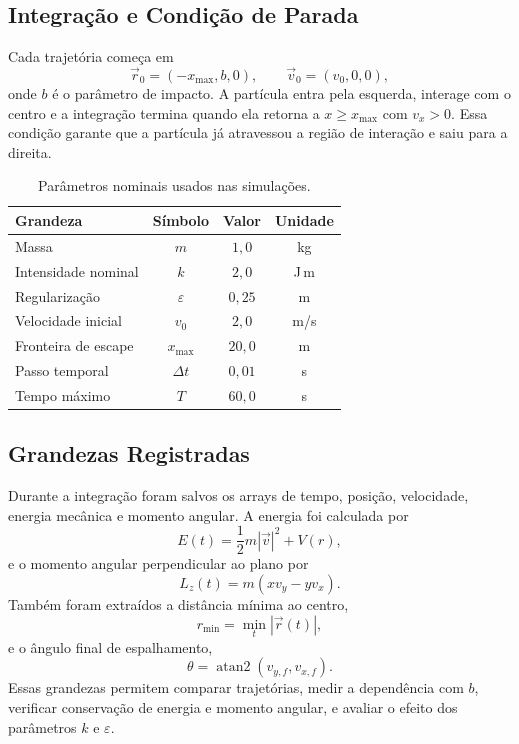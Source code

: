 \subsection{Integra\c{c}\~ao e Condi\c{c}\~ao de Parada}

Cada trajet\'oria come\c{c}a em
\begin{equation}
    \vec r_0=(-x_{\max}, b, 0),
    \qquad
    \vec v_0=(v_0,0,0),
\end{equation}
onde $b$ \'e o par\^ametro de impacto. A part\'icula entra pela esquerda, interage com o centro e a integra\c{c}\~ao termina quando ela retorna a $x\geq x_{\max}$ com $v_x>0$. Essa condi\c{c}\~ao garante que a part\'icula j\'a atravessou a regi\~ao de intera\c{c}\~ao e saiu para a direita.

\begin{table}[H]
    \centering
    \caption{Par\^ametros nominais usados nas simula\c{c}\~oes.}
    \label{tab:parametros}
    \begin{tabular}{lccc}
        \toprule
        Grandeza & S\'imbolo & Valor & Unidade \\
        \midrule
        Massa & $m$ & $1{,}0$ & kg \\
        Intensidade nominal & $k$ & $2{,}0$ & J\,m \\
        Regulariza\c{c}\~ao & $\varepsilon$ & $0{,}25$ & m \\
        Velocidade inicial & $v_0$ & $2{,}0$ & m/s \\
        Fronteira de escape & $x_{\max}$ & $20{,}0$ & m \\
        Passo temporal & $\Delta t$ & $0{,}01$ & s \\
        Tempo m\'aximo & $T$ & $60{,}0$ & s \\
        \bottomrule
    \end{tabular}
\end{table}

\subsection{Grandezas Registradas}

Durante a integra\c{c}\~ao foram salvos os arrays de tempo, posi\c{c}\~ao, velocidade, energia mec\^anica e momento angular. A energia foi calculada por
\begin{equation}
    E(t)=\frac{1}{2}m|\vec v|^2 + V(r),
\end{equation}
e o momento angular perpendicular ao plano por
\begin{equation}
    L_z(t)=m(xv_y-yv_x).
\end{equation}
Tamb\'em foram extra\'idos a dist\^ancia m\'inima ao centro,
\begin{equation}
    r_{\min} = \min_t |\vec r(t)|,
\end{equation}
e o \^angulo final de espalhamento,
\begin{equation}
    \theta=\operatorname{atan2}(v_{y,f},v_{x,f}).
\end{equation}
Essas grandezas permitem comparar trajet\'orias, medir a depend\^encia com $b$, verificar conserva\c{c}\~ao de energia e momento angular, e avaliar o efeito dos par\^ametros $k$ e $\varepsilon$.
